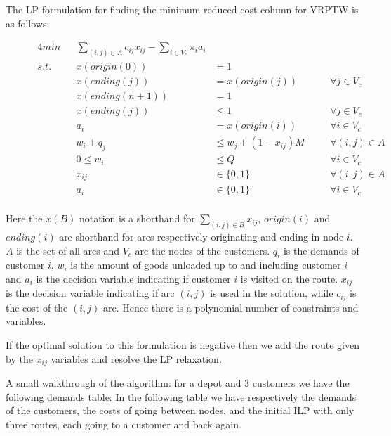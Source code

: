 The LP formulation for finding the minimum reduced cost column for VRPTW is as follows:

\begin{figure}[H]
\begin{alignat}{4}
min     && \sum_{(i,j) \in A} c_{ij} x_{ij} - \sum_{i \in V_c} \pi_i a_i \\
s.t.    && x(origin(0))      & = 1 \\
        && x(ending(j))      & = x(origin(j))               && \forall j \in V_c \\
        && x(ending(n+1))    & = 1 \\
        && x(ending(j))      & \leq 1                       && \forall j \in V_c \\
        && a_i               & = x(origin(i))               && \forall i \in V_c \\
        && w_i + q_j         & \leq w_j + (1-x_{ij})M \quad && \forall (i,j) \in A \\
        && 0 \leq w_i        & \leq Q                       && \forall i \in V_c \\
        && x_{ij}            & \in \{0,1\}                  && \forall (i,j) \in A \\
        && a_{i}             & \in \{0,1\}                  && \forall i \in V_c \\
\end{alignat}
\end{figure}
Here the $x(B)$ notation is a shorthand for $\sum_{(i,j) \in B} x_{ij}$, $origin(i)$ and $ending(i)$ are shorthand for arcs respectively originating and ending in node $i$. $A$ is the set of all arcs and $V_c$ are the nodes of the customers. $q_i$ is the demands of customer $i$, $w_i$ is the amount of goods unloaded up to and including customer $i$ and $a_i$ is the decision variable indicating if customer $i$ is visited on the route. $x_{ij}$ is the decision variable indicating if arc $(i,j)$ is used in the solution, while $c_{ij}$ is the cost of the $(i,j)$-arc. Hence there is a polynomial number of constraints and variables. 

If the optimal solution to this formulation is negative then we add the route given by the $x_{ij}$ variables and resolve the LP relaxation.

\newpar A small walkthrough of the algorithm: for a depot and 3 customers we have the following demands table: In the following table we have respectively the demands of the customers, the costs of going between nodes, and the initial ILP with only three routes, each going to a customer and back again.

